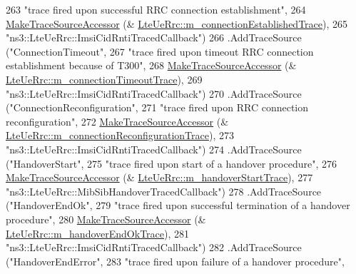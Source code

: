\begin{DoxyCode}
263                      \textcolor{stringliteral}{"trace fired upon successful RRC connection establishment"},
264                      \hyperlink{group__tracing_gab21a770b9855af4e8f69f7531ea4a6b0}{MakeTraceSourceAccessor} (&
      \hyperlink{classns3_1_1LteUeRrc_a698ac3b66bd6073dcab222d72bf2745e}{LteUeRrc::m\_connectionEstablishedTrace}),
265                      \textcolor{stringliteral}{"ns3::LteUeRrc::ImsiCidRntiTracedCallback"})
266     .AddTraceSource (\textcolor{stringliteral}{"ConnectionTimeout"},
267                      \textcolor{stringliteral}{"trace fired upon timeout RRC connection establishment because of T300"},
268                      \hyperlink{group__tracing_gab21a770b9855af4e8f69f7531ea4a6b0}{MakeTraceSourceAccessor} (&
      \hyperlink{classns3_1_1LteUeRrc_a41fda1be11c17492bd41f57c33941c83}{LteUeRrc::m\_connectionTimeoutTrace}),
269                      \textcolor{stringliteral}{"ns3::LteUeRrc::ImsiCidRntiTracedCallback"})
270     .AddTraceSource (\textcolor{stringliteral}{"ConnectionReconfiguration"},
271                      \textcolor{stringliteral}{"trace fired upon RRC connection reconfiguration"},
272                      \hyperlink{group__tracing_gab21a770b9855af4e8f69f7531ea4a6b0}{MakeTraceSourceAccessor} (&
      \hyperlink{classns3_1_1LteUeRrc_a97006f431abc80ea1809e7b50ca82c86}{LteUeRrc::m\_connectionReconfigurationTrace}),
273                      \textcolor{stringliteral}{"ns3::LteUeRrc::ImsiCidRntiTracedCallback"})
274     .AddTraceSource (\textcolor{stringliteral}{"HandoverStart"},
275                      \textcolor{stringliteral}{"trace fired upon start of a handover procedure"},
276                      \hyperlink{group__tracing_gab21a770b9855af4e8f69f7531ea4a6b0}{MakeTraceSourceAccessor} (&
      \hyperlink{classns3_1_1LteUeRrc_afdfd3280326e69183947c7f70bf72d11}{LteUeRrc::m\_handoverStartTrace}),
277                      \textcolor{stringliteral}{"ns3::LteUeRrc::MibSibHandoverTracedCallback"})
278     .AddTraceSource (\textcolor{stringliteral}{"HandoverEndOk"},
279                      \textcolor{stringliteral}{"trace fired upon successful termination of a handover procedure"},
280                      \hyperlink{group__tracing_gab21a770b9855af4e8f69f7531ea4a6b0}{MakeTraceSourceAccessor} (&
      \hyperlink{classns3_1_1LteUeRrc_a72e8b2d3a4b7a8b0dcb3c66d91ec0f79}{LteUeRrc::m\_handoverEndOkTrace}),
281                      \textcolor{stringliteral}{"ns3::LteUeRrc::ImsiCidRntiTracedCallback"})
282     .AddTraceSource (\textcolor{stringliteral}{"HandoverEndError"},
283                      \textcolor{stringliteral}{"trace fired upon failure of a handover procedure"},

\end{DoxyCode}
